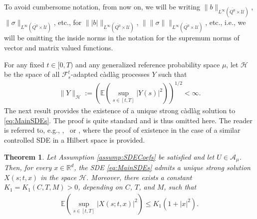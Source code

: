 \documentclass[amscd,amssymb,11pt]{article}
\newtheorem{theorem}{Theorem}
\numberwithin{theorem}{section}
\numberwithin{equation}{section}
\begin{document}
To avoid cumbersome notation, from now on, we will be writing $\|b\|_{L^{\infty}(\overline{Q^{0}}\times\mathcal{U})}$, $\|\sigma\|_{L^{\infty}(\overline{Q^{0}}\times\mathcal{U})}$, etc., for $\||b|\|_{L^{\infty}(\overline{Q^{0}}\times\mathcal{U})}$, $\|\|\sigma\|\|_{L^{\infty}(\overline{Q^{0}}\times\mathcal{U})}$, etc., i.e., we will be omitting the inside norms in the notation for the supremum norms of vector and matrix valued functions.

For any fixed $t\in[0,T)$ and any generalized reference probability space $\mu$, let $\mathcal{H}$ be the space of all $\mathscr{F}_{s}^{t}$-adapted c\`{a}dl\`{a}g processes $Y$ such that
\begin{align*}
\|Y\|_{\mathcal{H}}:=\left(\mathbb{E}\left(\sup_{s\in[t,T]}|Y(s)|^{2}\right)\right)^{1/2}<\infty.
\end{align*}
The next result provides the existence of a unique strong c\`{a}dl\`{a}g solution to \eqref{eq:MainSDEs}. The proof is quite standard and is thus omitted here. The reader is referred to, e.g., \cite[Section 6.2]{Appelbaum:2009},~\cite[Section 1.3]{OksendalSulem:2007} or \cite{SwiechZabczyk:2016}, where the proof of existence in the case of a similar controlled SDE in a Hilbert space is provided.
\begin{theorem}\label{thm:StrSolsSDEs}
Let Assumption \ref{assump:SDECoefs} be satisfied and let $U\in\mathcal{A}_{\mu}$. Then, for every $x\in\mathbb{R}^{d}$, the SDE \eqref{eq:MainSDEs} admits a unique strong solution $X(s;t,x)$ in the space $\mathcal{H}$. Moreover, there exists a constant $K_{1}=K_{1}(C,T,M)>0$, depending on $C$, $T$, and $M$, such that
\begin{align}\label{eq:Est2ndMoment}
\mathbb{E}\left(\sup_{s\in[t,T]}\left|X(s;t,x)\right|^{2}\right)\leq K_{1}\left(1+|x|^{2}\right).
\end{align}
\end{theorem}

\end{document}
